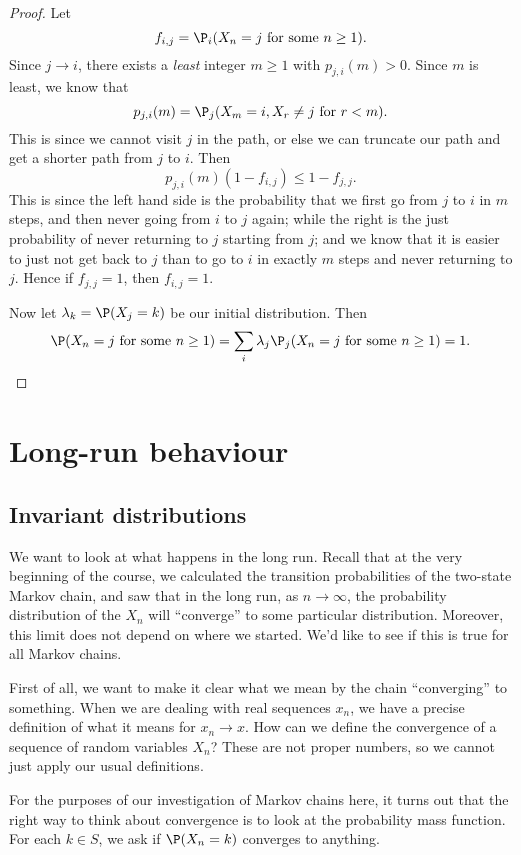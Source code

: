 \documentclass[a4paper]{article}
\begin{document}
\begin{proof}
  Let
  \[
    f_{i, j} = \P_i(X_n = j\text{ for some }n \geq 1).
  \]
  Since $j \to i$, there exists a \emph{least} integer $m \geq 1$ with $p_{j, i}(m) > 0$. Since $m$ is least, we know that
  \[
    p_{j, i}(m) = \P_j(X_m = i, X_r \not= j\text{ for }r < m).
  \]
  This is since we cannot visit $j$ in the path, or else we can truncate our path and get a shorter path from $j$ to $i$. Then
  \[
    p_{j, i}(m)(1 - f_{i, j}) \leq 1 - f_{j, j}.
  \]
  This is since the left hand side is the probability that we first go from $j$ to $i$ in $m$ steps, and then never going from $i$ to $j$ again; while the right is the just probability of never returning to $j$ starting from $j$; and we know that it is easier to just not get back to $j$ than to go to $i$ in exactly $m$ steps and never returning to $j$. Hence if $f_{j, j} = 1$, then $f_{i, j} = 1$.

  Now let $\lambda_k = \P(X_j = k)$ be our initial distribution. Then
  \[
    \P(X_n = j\text{ for some }n \geq 1) = \sum_i \lambda_j \P_j (X_n =j\text{ for some }n \geq 1) = 1.
  \]
\end{proof}

\section{Long-run behaviour}
\subsection{Invariant distributions}
We want to look at what happens in the long run. Recall that at the very beginning of the course, we calculated the transition probabilities of the two-state Markov chain, and saw that in the long run, as $n \to \infty$, the probability distribution of the $X_n$ will ``converge'' to some particular distribution. Moreover, this limit does not depend on where we started. We'd like to see if this is true for all Markov chains.

First of all, we want to make it clear what we mean by the chain ``converging'' to something. When we are dealing with real sequences $x_n$, we have a precise definition of what it means for $x_n \to x$. How can we define the convergence of a sequence of random variables $X_n$? These are not proper numbers, so we cannot just apply our usual definitions.

For the purposes of our investigation of Markov chains here, it turns out that the right way to think about convergence is to look at the probability mass function. For each $k \in S$, we ask if $\P(X_n = k)$ converges to anything.
\end{document}
